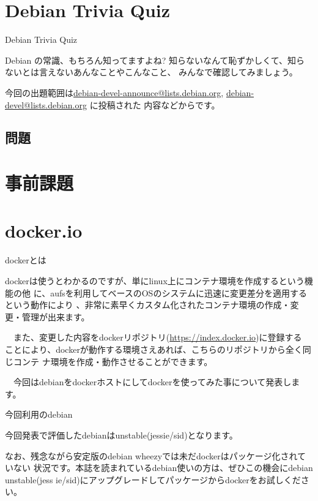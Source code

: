 \section{Debian Trivia Quiz}
\begin{frame}{Debian Trivia Quiz}

  Debian の常識、もちろん知ってますよね?
知らないなんて恥ずかしくて、知らないとは言えないあんなことやこんなこと、
みんなで確認してみましょう。

今回の出題範囲は\url{debian-devel-announce@lists.debian.org},
\url{debian-devel@lists.debian.org} に投稿された
内容などからです。

\end{frame}

\subsection{問題}



\section{事前課題}
{\footnotesize

}

\section{docker.io}

\begin{frame}{dockerとは}

 dockerは使うとわかるのですが、単にlinux上にコンテナ環境を作成するという機能の他
に、aufsを利用してベースのOSのシステムに迅速に変更差分を適用するという動作により
、非常に素早くカスタム化されたコンテナ環境の作成・変更・管理が出来ます。

　また、変更した内容をdockerリポジトリ(\url{https://index.docker.io})に登録する
ことにより、dockerが動作する環境さえあれば、こちらのリポジトリから全く同じコンテ
ナ環境を作成・動作させることができます。

　今回はdebianをdockerホストにしてdockerを使ってみた事について発表します。

\end{frame}

\begin{frame}{今回利用のdebian}

今回発表で評価したdebianはunstable(jessie/sid)となります。

 なお、残念ながら安定版のdebian wheezyでは未だdockerはパッケージ化されていない
状況です。本誌を読まれているdebian使いの方は、ぜひこの機会にdebian unstable(jess
ie/sid)にアップグレードしてパッケージからdockerをお試しください。

\end{frame}

